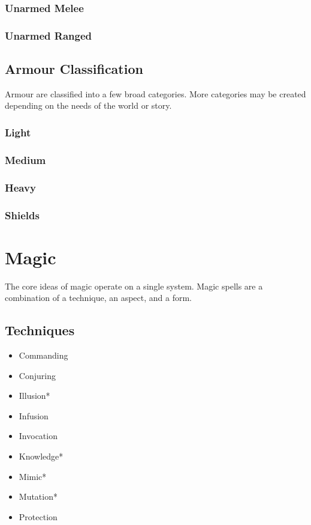 \documentclass[]{article}
\providecommand{\tightlist}{%
  \setlength{\itemsep}{0pt}\setlength{\parskip}{0pt}}
\begin{document}
\subsubsection{Unarmed Melee}\label{unarmed-melee}

\subsubsection{Unarmed Ranged}\label{unarmed-ranged}

\subsection{Armour Classification}\label{armour-classification}

Armour are classified into a few broad categories. More categories may
be created depending on the needs of the world or story.

\subsubsection{Light}\label{light}

\subsubsection{Medium}\label{medium}

\subsubsection{Heavy}\label{heavy}

\subsubsection{Shields}\label{shields}

\section{Magic}\label{magic}

The core ideas of magic operate on a single system. Magic spells are a
combination of a technique, an aspect, and a form.

\subsection{Techniques}\label{techniques}

\begin{itemize}
\tightlist
\item
  Commanding
\item
  Conjuring
\item
  Illusion*
\item
  Infusion
\item
  Invocation
\item
  Knowledge*
\item
  Mimic*
\item
  Mutation*
\item
  Protection
\end{itemize}
\end{document}
